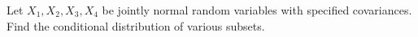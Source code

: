 Let $X_1, X_2, X_3, X_4$ be jointly normal random variables with specified covariances. Find the conditional distribution of various subsets.
